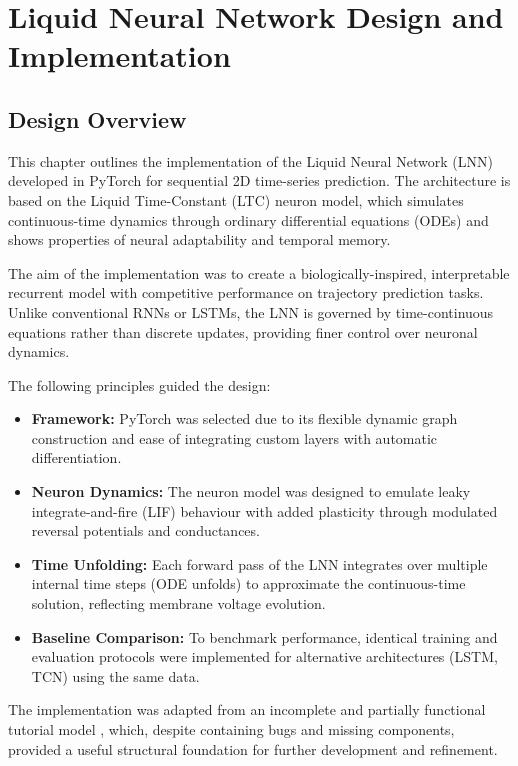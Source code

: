 \chapter{Liquid Neural Network Design and Implementation}

\section{Design Overview}
This chapter outlines the implementation of the Liquid Neural Network (LNN) developed in PyTorch for sequential 2D time-series prediction. The architecture is based on the Liquid Time-Constant (LTC) neuron model, which simulates continuous-time dynamics through ordinary differential equations (ODEs) and shows properties of neural adaptability and temporal memory.

The aim of the implementation was to create a biologically-inspired, interpretable recurrent model with competitive performance on trajectory prediction tasks. Unlike conventional RNNs or LSTMs, the LNN is governed by time-continuous equations rather than discrete updates, providing finer control over neuronal dynamics.

\vspace{1em}
\noindent The following principles guided the design:
\begin{itemize}
    \item \textbf{Framework:} PyTorch was selected due to its flexible dynamic graph construction and ease of integrating custom layers with automatic differentiation.
    \item \textbf{Neuron Dynamics:} The neuron model was designed to emulate leaky integrate-and-fire (LIF) behaviour with added plasticity through modulated reversal potentials and conductances.
    \item \textbf{Time Unfolding:} Each forward pass of the LNN integrates over multiple internal time steps (ODE unfolds) to approximate the continuous-time solution, reflecting membrane voltage evolution.
    \item \textbf{Baseline Comparison:} To benchmark performance, identical training and evaluation protocols were implemented for alternative architectures (LSTM, TCN) using the same data.
\end{itemize}

The implementation was adapted from an incomplete and partially functional tutorial model \cite{ltctutorial2022}, which, despite containing bugs and missing components, provided a useful structural foundation for further development and refinement.

